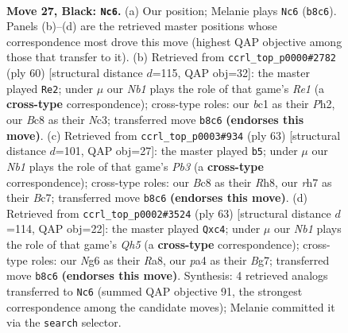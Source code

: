 \documentclass[11pt]{article}
\begin{document}
\clearpage

\begin{figure}[p]\centering
\begin{subfigure}{0.46\textwidth}\centering
\resizebox{\linewidth}{!}{%
\newchessgame
\chessboard[
  setfen={rnb1r3/1p1k1p1R/4p1n1/pBP1P1Q1/P4P2/8/5K2/q1B3N1 b - - 1 27},
  showmover=false,
  pgfstyle=straightmove, color=movearrow, markmove={b8-c6}
]}
\caption{}
\end{subfigure}\hfill
\begin{subfigure}{0.46\textwidth}\centering
\resizebox{\linewidth}{!}{%
\newchessgame
\chessboard[
  setfen={3bb1k1/5pp1/pq2p3/2r1P3/2B3Q1/1PN3P1/1P5P/1K2R3 w - - 5 31},
  showmover=false,
  pgfstyle=straightmove, color=movearrow, markmove={e1-e2}
]}
\caption{}
\end{subfigure}
\\[4pt]
\begin{subfigure}{0.46\textwidth}\centering
\resizebox{\linewidth}{!}{%
\newchessgame
\chessboard[
  setfen={1k2n2r/p1b5/Bpp5/3pP1Q1/3P1BPp/2N4q/PP6/2K5 b - - 2 32},
  showmover=false,
  pgfstyle=straightmove, color=movearrow, markmove={b6-b5}
]}
\caption{}
\end{subfigure}\hfill
\begin{subfigure}{0.46\textwidth}\centering
\resizebox{\linewidth}{!}{%
\newchessgame
\chessboard[
  setfen={r5k1/5pbp/2bNn1p1/p1P1p3/2Q4q/RPN1B2P/5PP1/6K1 b - - 5 32},
  showmover=false,
  pgfstyle=straightmove, color=movearrow, markmove={h4-c4}
]}
\caption{}
\end{subfigure}
\caption{\textbf{Move 27, Black: \texttt{Nc6}.} (a) Our position; Melanie plays \texttt{Nc6} (\texttt{b8c6}). Panels (b)--(d) are the retrieved master positions whose correspondence most drove this move (highest QAP objective among those that transfer to it). (b) Retrieved from \texttt{ccrl\_top\_p0000\#2782} (ply 60) [structural distance $d$=115, QAP obj=32]: the master played \texttt{Re2}; under $\mu$ our \emph{Nb1} plays the role of that game's \emph{Re1} (a \textbf{cross-type} correspondence); cross-type roles: our \emph{b}c1 as their \emph{P}h2, our \emph{B}c8 as their \emph{N}c3; transferred move \texttt{b8c6} \textbf{(endorses this move)}. (c) Retrieved from \texttt{ccrl\_top\_p0003\#934} (ply 63) [structural distance $d$=101, QAP obj=27]: the master played \texttt{b5}; under $\mu$ our \emph{Nb1} plays the role of that game's \emph{Pb3} (a \textbf{cross-type} correspondence); cross-type roles: our \emph{B}c8 as their \emph{R}h8, our \emph{r}h7 as their \emph{B}c7; transferred move \texttt{b8c6} \textbf{(endorses this move)}. (d) Retrieved from \texttt{ccrl\_top\_p0002\#3524} (ply 63) [structural distance $d$=114, QAP obj=22]: the master played \texttt{Qxc4}; under $\mu$ our \emph{Nb1} plays the role of that game's \emph{Qh5} (a \textbf{cross-type} correspondence); cross-type roles: our \emph{N}g6 as their \emph{R}a8, our \emph{p}a4 as their \emph{B}g7; transferred move \texttt{b8c6} \textbf{(endorses this move)}. Synthesis: 4 retrieved analogs transferred to \texttt{Nc6} (summed QAP objective 91, the strongest correspondence among the candidate moves); Melanie committed it via the \texttt{search} selector.}
\label{fig:thought-m53}
\end{figure}
\end{document}
